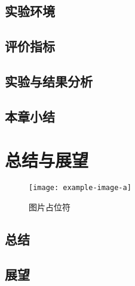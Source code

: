 \section{实验环境}
\section{评价指标}
\section{实验与结果分析}
\section{本章小结}

\chapter{总结与展望}
\begin{figure}[htbp]
    \centering
    \texttt{[image: example-image-a]}
    \caption{\label{fig:fig-placeholder}图片占位符}
\end{figure}
\section{总结}
\section{展望}
